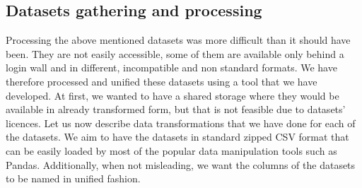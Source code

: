 \subsection{Datasets gathering and processing} \label{subsec:04_single_user_datasets.gathering_processing}

Processing the above mentioned datasets was more difficult than it should have been. They are not easily accessible, some of them are available only behind a login wall and in different, incompatible and non standard formats. We have therefore processed and unified these datasets using a tool that we have developed. At first, we wanted to have a shared storage where they would be available in already transformed form, but that is not feasible due to datasets' licences. Let us now describe data transformations that we have done for each of the datasets. We aim to have the datasets in standard zipped CSV format that can be easily loaded by most of the popular data manipulation tools such as Pandas. Additionally, when not misleading, we want the columns of the datasets to be named in unified fashion.

